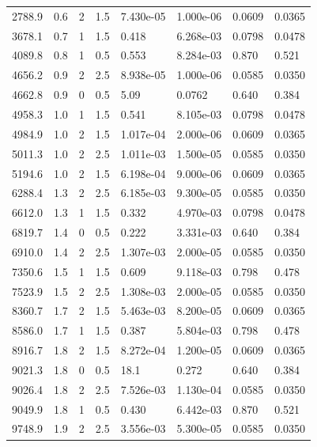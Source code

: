 \documentclass[preview]{standalone}
\begin{document}
{{\begin{tabular}{L{1.2cm}C{1.2cm} C{0.3cm}C{0.5cm} C{1.4cm}C{1.4cm} C{1.4cm}C{1.4cm}}
  2788.9  &   0.6  & 2     & 1.5 &  7.430e-05  & 1.000e-06  & 0.0609 &  0.0365   \\ 
  3678.1  &   0.7  & 1     & 1.5 &  0.418  & 6.268e-03  & 0.0798 &  0.0478   \\ 
  4089.8  &   0.8  & 1     & 0.5 &  0.553  & 8.284e-03  & 0.870 &  0.521   \\ 
  4656.2  &   0.9  & 2     & 2.5 &  8.938e-05  & 1.000e-06  & 0.0585 &  0.0350   \\ 
  4662.8  &   0.9  & 0     & 0.5 &  5.09  & 0.0762  & 0.640 &  0.384   \\ 
  4958.3  &   1.0  & 1     & 1.5 &  0.541  & 8.105e-03  & 0.0798 &  0.0478   \\ 
  4984.9  &   1.0  & 2     & 1.5 &  1.017e-04  & 2.000e-06  & 0.0609 &  0.0365   \\ 
  5011.3  &   1.0  & 2     & 2.5 &  1.011e-03  & 1.500e-05  & 0.0585 &  0.0350   \\ 
  5194.6  &   1.0  & 2     & 1.5 &  6.198e-04  & 9.000e-06  & 0.0609 &  0.0365   \\ 
  6288.4  &   1.3  & 2     & 2.5 &  6.185e-03  & 9.300e-05  & 0.0585 &  0.0350   \\ 
  6612.0  &   1.3  & 1     & 1.5 &  0.332  & 4.970e-03  & 0.0798 &  0.0478   \\ 
  6819.7  &   1.4  & 0     & 0.5 &  0.222  & 3.331e-03  & 0.640 &  0.384   \\ 
  6910.0  &   1.4  & 2     & 2.5 &  1.307e-03  & 2.000e-05  & 0.0585 &  0.0350   \\ 
  7350.6  &   1.5  & 1     & 1.5 &  0.609  & 9.118e-03  & 0.798 &  0.478   \\ 
  7523.9  &   1.5  & 2     & 2.5 &  1.308e-03  & 2.000e-05  & 0.0585 &  0.0350   \\ 
  8360.7  &   1.7  & 2     & 1.5 &  5.463e-03  & 8.200e-05  & 0.0609 &  0.0365   \\ 
  8586.0  &   1.7  & 1     & 1.5 &  0.387  & 5.804e-03  & 0.798 &  0.478   \\ 
  8916.7  &   1.8  & 2     & 1.5 &  8.272e-04  & 1.200e-05  & 0.0609 &  0.0365   \\ 
  9021.3  &   1.8  & 0     & 0.5 &  18.1  & 0.272  & 0.640 &  0.384   \\ 
  9026.4  &   1.8  & 2     & 2.5 &  7.526e-03  & 1.130e-04  & 0.0585 &  0.0350   \\ 
  9049.9  &   1.8  & 1     & 0.5 &  0.430  & 6.442e-03  & 0.870 &  0.521   \\ 
  9748.9  &   1.9  & 2     & 2.5 &  3.556e-03  & 5.300e-05  & 0.0585 &  0.0350   \\ 

\end{tabular}}}
\end{document}
